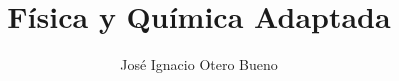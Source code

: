 \documentclass[12pt]{book}
\title{Física y Química Adaptada}
\author{José Ignacio Otero Bueno}
\begin{document}
	
\maketitle

\tableofcontents



%
%

%

%
%

\nocite{*}


\end{document}
